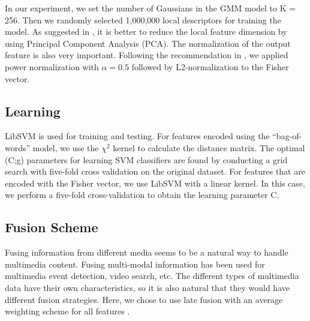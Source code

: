 In our experiment, we set the number of Gaussians in the GMM model to K = 256. Then we randomly selected 1,000,000 local descriptors for training the model. As suggested in \cite{perronnin2010improving}, it is better to reduce the local feature dimension by using Principal Component Analysis (PCA). The normalization of the output feature is also very important. Following the recommendation in \cite{perronnin2010improving}, we applied power normalization with $\alpha=0.5$ followed by L2-normalization to the Fisher vector.


\subsection{Learning}

LibSVM \cite{chang2011libsvm} is used for training and testing. For features encoded using the ``bag-of-words'' model, we use the $\chi^2$ kernel to calculate the distance matrix. The optimal (C;g) parameters for learning SVM classifiers are found by conducting a grid search with five-fold cross validation on the original dataset. For features that are encoded with the Fisher vector, we use LibSVM with a linear kernel. In this case, we perform a five-fold cross-validation to obtain the learning parameter C.

\subsection{Fusion Scheme}
Fusing information from different media seems to be a natural way to handle multimedia content. Fusing multi-modal information has been used for multimedia event detection, video search, etc. The different types of multimedia data have their own characteristics, so it is also natural that they would have different fusion strategies. Here, we chose to use late fusion with an average weighting scheme for all features \cite{snoek2005early}.
